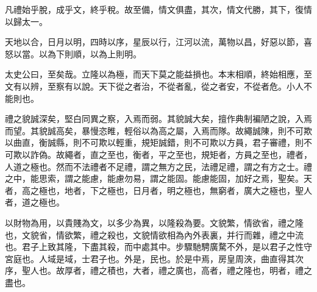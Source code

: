 凡禮始乎脫，成乎文，終乎稅。故至備，情文俱盡，其次，情文代勝，其下，復情以歸太一。

天地以合，日月以明，四時以序，星辰以行，江河以流，萬物以昌，好惡以節，喜怒以當。以為下則順，以為上則明。

太史公曰，至矣哉。立隆以為極，而天下莫之能益損也。本末相順，終始相應，至文有以辨，至察有以說。天下從之者治，不從者亂，從之者安，不從者危。小人不能則也。

禮之貌誠深矣，堅白同異之察，入焉而弱。其貌誠大矣，擅作典制褊陋之說，入焉而望。其貌誠高矣，暴慢恣睢，輕俗以為高之屬，入焉而隊。故繩誠陳，則不可欺以曲直，衡誠縣，則不可欺以輕重，規矩誠錯，則不可欺以方員，君子審禮，則不可欺以詐偽。故繩者，直之至也，衡者，平之至也，規矩者，方員之至也，禮者，人道之極也。然而不法禮者不足禮，謂之無方之民，法禮足禮，謂之有方之士。禮之中，能思索，謂之能慮，能慮勿易，謂之能固。能慮能固，加好之焉，聖矣。天者，高之極也，地者，下之極也，日月者，明之極也，無窮者，廣大之極也，聖人者，道之極也。

以財物為用，以貴賤為文，以多少為異，以隆殺為要。文貌繁，情欲省，禮之隆也，文貌省，情欲繁，禮之殺也，文貌情欲相為內外表裏，并行而雜，禮之中流也。君子上致其隆，下盡其殺，而中處其中。步驟馳騁廣騖不外，是以君子之性守宮庭也。人域是域，士君子也。外是，民也。於是中焉，房皇周浹，曲直得其次序，聖人也。故厚者，禮之積也，大者，禮之廣也，高者，禮之隆也，明者，禮之盡也。